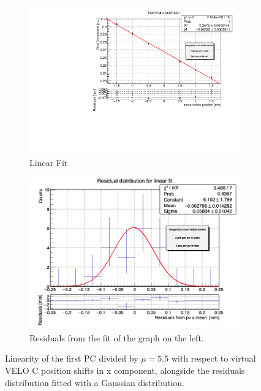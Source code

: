 \begin{figure}
    \centering
    \begin{subfigure}{0.48\textwidth}
    \includegraphics[width=\linewidth]{figures/x_fit_veloC_MC_normalised.pdf}
    \caption{Linear Fit}\label{fig:x_veloC_fit_MC}
    \end{subfigure}
    \begin{subfigure}{0.48\textwidth}
    \includegraphics[width=\linewidth]{figures/x_res_veloC_MC.png}
    \caption{Residuals from the fit of the graph on the left. }\label{fig:x_veloC_res_MC}
    \end{subfigure}
    \caption{Linearity of the first PC divided by $\mu=5.5$ with respect to  virtual VELO C position shifts in x component, alongside the residuals distribution fitted with a Gaussian distribution.}
    \label{fig:x_veloC_MC}
\end{figure}
